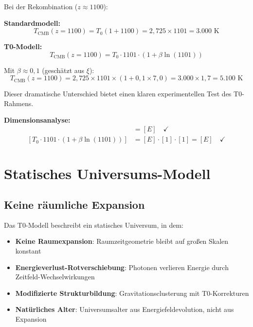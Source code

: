 \documentclass[12pt,a4paper]{report}
\begin{document}
	Bei der Rekombination ($z \approx 1100$):
	
	\textbf{Standardmodell:}
	\begin{equation}
		T_{\text{CMB}}(z = 1100) = T_0(1 + 1100) = 2,725 \times 1101 = 3.000 \text{ K}
	\end{equation}
	
	\textbf{T0-Modell:}
	\begin{equation}
		T_{\text{CMB}}(z = 1100) = T_0 \cdot 1101 \cdot (1 + \beta \ln(1101))
	\end{equation}
	
	Mit $\beta \approx 0,1$ (geschätzt aus $\xi$):
	\begin{equation}
		T_{\text{CMB}}(z = 1100) = 2,725 \times 1101 \times (1 + 0,1 \times 7,0) = 3.000 \times 1,7 = 5.100 \text{ K}
	\end{equation}
	
	Dieser dramatische Unterschied bietet einen klaren experimentellen Test des T0-Rahmens.
	
	\textbf{Dimensionsanalyse:}
	\begin{align}
		[T_{\text{CMB}}(z = 1100)] &= [E] \quad \checkmark \\
		[T_0 \cdot 1101 \cdot (1 + \beta \ln(1101))] &= [E] \cdot [1] \cdot [1] = [E] \quad \checkmark
	\end{align}
	
	\section{Statisches Universums-Modell}
	\label{sec:static_universe}
	
	\subsection{Keine räumliche Expansion}
	\label{subsec:no_spatial_expansion}
	
	Das T0-Modell beschreibt ein statisches Universum, in dem:
	\begin{itemize}
		\item \textbf{Keine Raumexpansion}: Raumzeitgeometrie bleibt auf großen Skalen konstant
		\item \textbf{Energieverlust-Rotverschiebung}: Photonen verlieren Energie durch Zeitfeld-Wechselwirkungen
		\item \textbf{Modifizierte Strukturbildung}: Gravitationsclusterung mit T0-Korrekturen
		\item \textbf{Natürliches Alter}: Universumsalter aus Energiefeldevolution, nicht aus Expansion
	\end{itemize}
	
\end{document}
